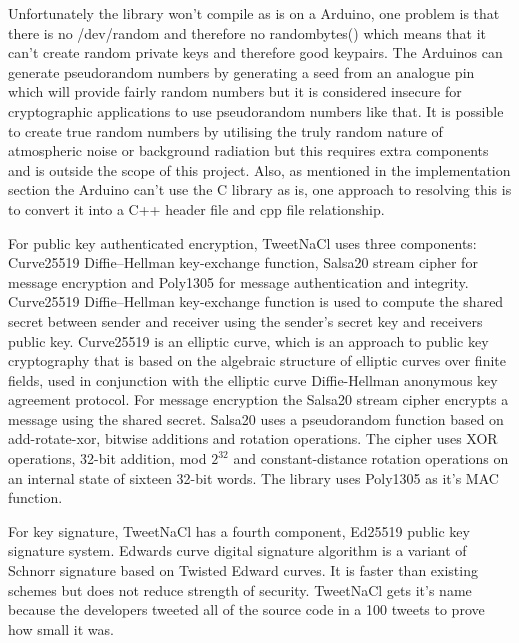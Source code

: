 Unfortunately the library won't compile as is on a Arduino, one problem is that there is no /dev/random and therefore no randombytes() which means that it can't create random private keys and therefore good keypairs. The Arduinos can generate pseudorandom numbers by generating a seed from an analogue pin which will provide fairly random numbers but it is considered insecure for cryptographic applications to use pseudorandom numbers like that\cite{arduinopseudo}. It is possible to create true random numbers by utilising the truly random nature of atmospheric noise or background radiation but this requires extra components and is outside the scope of this project. Also, as mentioned in the implementation section the Arduino can't use the C library as is, one approach to resolving this is to convert it into a C++ header file and cpp file relationship.

For public key authenticated encryption, TweetNaCl uses three components: Curve25519 Diffie–Hellman key-exchange function, Salsa20 stream cipher for message encryption and Poly1305 for message authentication and integrity. Curve25519 Diffie–Hellman key-exchange function is used to compute the shared secret between sender and receiver using the sender's secret key and receivers public key. Curve25519 is an elliptic curve, which is an approach to public key cryptography that is based on the algebraic structure of elliptic curves over finite fields, used in conjunction with the elliptic curve Diffie-Hellman anonymous key agreement protocol\cite{curve}. For message encryption the Salsa20 stream cipher encrypts a message using the shared secret. Salsa20 uses a pseudorandom function based on add-rotate-xor, bitwise additions and rotation operations. The cipher uses XOR operations, 32-bit addition, mod $2^{32}$ and constant-distance rotation operations on an internal state of sixteen 32-bit words\cite{salsa}. The library uses Poly1305 as it's MAC function\cite{poly}.

For key signature, TweetNaCl has a fourth component, Ed25519 public key signature system. Edwards curve digital signature algorithm is a variant of Schnorr signature based on Twisted Edward curves. It is faster than existing schemes but does not reduce strength of security\cite{ed25}. TweetNaCl gets it's name because the developers tweeted all of the source code in a 100 tweets to prove how small it was.


